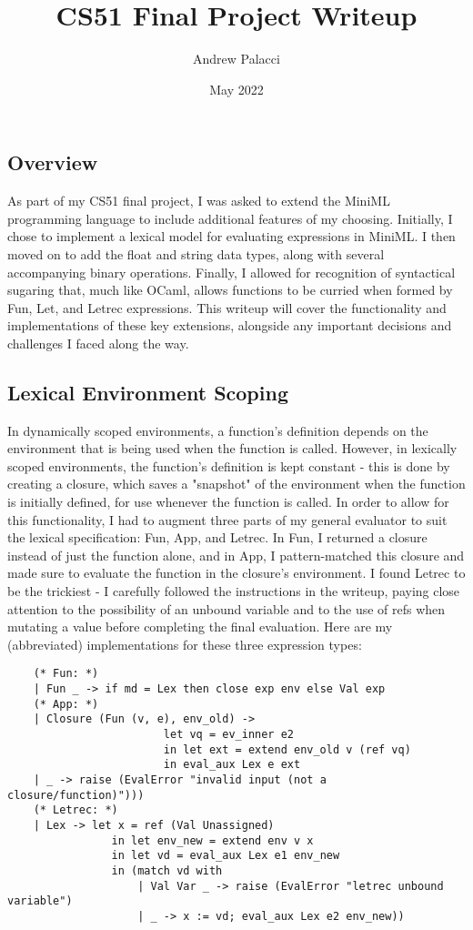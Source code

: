\documentclass{article}
\title{CS51 Final Project Writeup}
\author{Andrew Palacci}
\date{May 2022}
\begin{document}
\maketitle

\doublespacing


\subsection*{Overview}
As part of my CS51 final project, I was asked to extend the MiniML programming language to include additional features of my choosing. Initially, I chose to implement a lexical model for evaluating expressions in MiniML. I then moved on to add the float and string data types, along with several accompanying binary operations. Finally, I allowed for recognition of syntactical sugaring that, much like OCaml, allows functions to be curried when formed by Fun, Let, and Letrec expressions. This writeup will cover the functionality and implementations of these key extensions, alongside any important decisions and challenges I faced along the way. 
\pagebreak

\subsection*{Lexical Environment Scoping}
In dynamically scoped environments, a function's definition depends on the environment that is being used when the function is called. However, in lexically scoped environments, the function's definition is kept constant - this is done by creating a closure, which saves a "snapshot" of the environment when the function is initially defined, for use whenever the function is called. In order to allow for this functionality, I had to augment three parts of my general evaluator to suit the lexical specification: Fun, App, and Letrec. In Fun, I returned a closure instead of just the function alone, and in App, I pattern-matched this closure and made sure to evaluate the function in the closure's environment. I found Letrec to be the trickiest - I carefully followed the instructions in the writeup, paying close attention to the possibility of an unbound variable and to the use of refs when mutating a value before completing the final evaluation. Here are my (abbreviated) implementations for these three expression types: 

\begin{verbatim}
    (* Fun: *)
    | Fun _ -> if md = Lex then close exp env else Val exp
    (* App: *)
    | Closure (Fun (v, e), env_old) -> 
                        let vq = ev_inner e2 
                        in let ext = extend env_old v (ref vq)
                        in eval_aux Lex e ext
    | _ -> raise (EvalError "invalid input (not a closure/function)")))
    (* Letrec: *)
    | Lex -> let x = ref (Val Unassigned)
                in let env_new = extend env v x
                in let vd = eval_aux Lex e1 env_new
                in (match vd with
                    | Val Var _ -> raise (EvalError "letrec unbound variable")
                    | _ -> x := vd; eval_aux Lex e2 env_new))
\end{verbatim}
\end{document}
